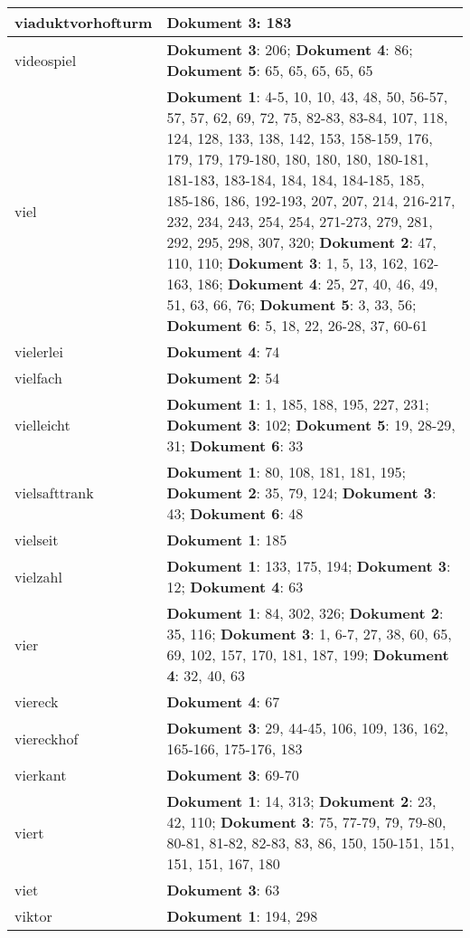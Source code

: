 \documentclass[a5paper]{article}
\begin{document}
\begin{longtable}[l]{|l|p{3in}|}
\hline
viaduktvorhofturm & \textbf{Dokument 3}: 183 \\
\hline
videospiel & \textbf{Dokument 3}: 206; \textbf{Dokument 4}: 86; \textbf{Dokument 5}: 65, 65, 65, 65, 65 \\
\hline
viel & \textbf{Dokument 1}: 4-5, 10, 10, 43, 48, 50, 56-57, 57, 57, 62, 69, 72, 75, 82-83, 83-84, 107, 118, 124, 128, 133, 138, 142, 153, 158-159, 176, 179, 179, 179-180, 180, 180, 180, 180-181, 181-183, 183-184, 184, 184, 184-185, 185, 185-186, 186, 192-193, 207, 207, 214, 216-217, 232, 234, 243, 254, 254, 271-273, 279, 281, 292, 295, 298, 307, 320; \textbf{Dokument 2}: 47, 110, 110; \textbf{Dokument 3}: 1, 5, 13, 162, 162-163, 186; \textbf{Dokument 4}: 25, 27, 40, 46, 49, 51, 63, 66, 76; \textbf{Dokument 5}: 3, 33, 56; \textbf{Dokument 6}: 5, 18, 22, 26-28, 37, 60-61 \\
\hline
vielerlei & \textbf{Dokument 4}: 74 \\
\hline
vielfach & \textbf{Dokument 2}: 54 \\
\hline
vielleicht & \textbf{Dokument 1}: 1, 185, 188, 195, 227, 231; \textbf{Dokument 3}: 102; \textbf{Dokument 5}: 19, 28-29, 31; \textbf{Dokument 6}: 33 \\
\hline
vielsafttrank & \textbf{Dokument 1}: 80, 108, 181, 181, 195; \textbf{Dokument 2}: 35, 79, 124; \textbf{Dokument 3}: 43; \textbf{Dokument 6}: 48 \\
\hline
vielseit & \textbf{Dokument 1}: 185 \\
\hline
vielzahl & \textbf{Dokument 1}: 133, 175, 194; \textbf{Dokument 3}: 12; \textbf{Dokument 4}: 63 \\
\hline
vier & \textbf{Dokument 1}: 84, 302, 326; \textbf{Dokument 2}: 35, 116; \textbf{Dokument 3}: 1, 6-7, 27, 38, 60, 65, 69, 102, 157, 170, 181, 187, 199; \textbf{Dokument 4}: 32, 40, 63 \\
\hline
viereck & \textbf{Dokument 4}: 67 \\
\hline
viereckhof & \textbf{Dokument 3}: 29, 44-45, 106, 109, 136, 162, 165-166, 175-176, 183 \\
\hline
vierkant & \textbf{Dokument 3}: 69-70 \\
\hline
viert & \textbf{Dokument 1}: 14, 313; \textbf{Dokument 2}: 23, 42, 110; \textbf{Dokument 3}: 75, 77-79, 79, 79-80, 80-81, 81-82, 82-83, 83, 86, 150, 150-151, 151, 151, 151, 167, 180 \\
\hline
viet & \textbf{Dokument 3}: 63 \\
\hline
viktor & \textbf{Dokument 1}: 194, 298 \\

\end{longtable}
\end{document}
